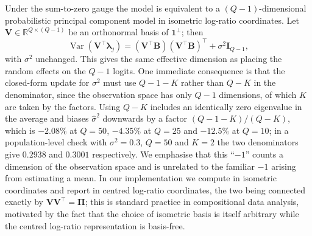 Under the sum-to-zero gauge the model is equivalent to a $(Q-1)$-dimensional probabilistic principal component model in isometric log-ratio coordinates. Let $\mathbf{V}\in\mathbb{R}^{Q\times(Q-1)}$ be an orthonormal basis of $\mathbf{1}^{\perp}$; then
\begin{equation}
\operatorname{Var}(\mathbf{V}^{\top}\bm{\lambda}_j)
=(\mathbf{V}^{\top}\mathbf{B})(\mathbf{V}^{\top}\mathbf{B})^{\top}+\sigma^{2}\mathbf{I}_{Q-1},
\end{equation}
with $\sigma^{2}$ unchanged. This gives the same effective dimension as placing the random effects on the $Q-1$ logits. One immediate consequence is that the closed-form update for $\sigma^{2}$ must use $Q-1-K$ rather than $Q-K$ in the denominator, since the observation space has only $Q-1$ dimensions, of which $K$ are taken by the factors. Using $Q-K$ includes an identically zero eigenvalue in the average and biases $\hat\sigma^{2}$ downwards by a factor $(Q-1-K)/(Q-K)$, which is $-2.08\%$ at $Q=50$, $-4.35\%$ at $Q=25$ and $-12.5\%$ at $Q=10$; in a population-level check with $\sigma^{2}=0.3$, $Q=50$ and $K=2$ the two denominators give $0.2938$ and $0.3001$ respectively. We emphasise that this ``$-1$'' counts a dimension of the observation space and is unrelated to the familiar $-1$ arising from estimating a mean. In our implementation we compute in isometric coordinates and report in centred log-ratio coordinates, the two being connected exactly by $\mathbf{V}\mathbf{V}^{\top}=\bm{\Pi}$; this is standard practice in compositional data analysis, motivated by the fact that the choice of isometric basis is itself arbitrary while the centred log-ratio representation is basis-free.

